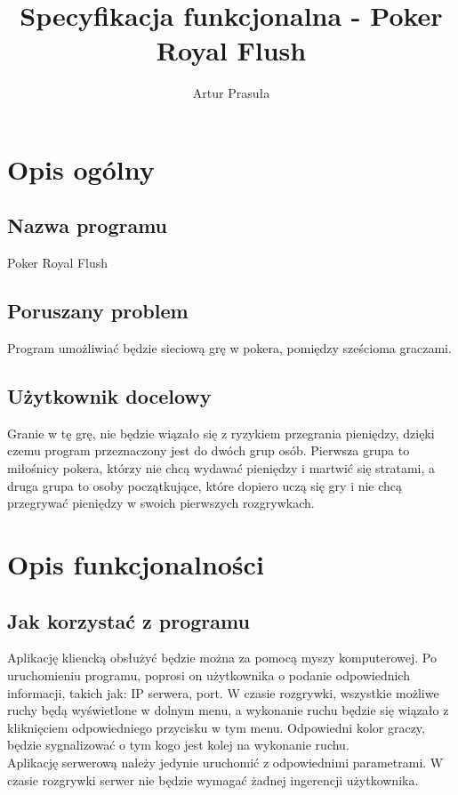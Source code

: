 \documentclass{article}
\title{Specyfikacja funkcjonalna - Poker Royal Flush}
\author{Artur Prasuła}
\begin{document}
\maketitle

\section{Opis ogólny}
    \subsection{Nazwa programu}
        Poker Royal Flush
    
    \subsection{Poruszany problem}
        Program umożliwiać będzie sieciową grę w pokera, pomiędzy sześcioma graczami.
    
    \subsection{Użytkownik docelowy}
        Granie w tę grę, nie będzie wiązało się z ryzykiem przegrania pieniędzy, dzięki czemu program przeznaczony jest do dwóch grup osób.
        Pierwsza grupa to miłośnicy pokera, którzy nie chcą wydawać pieniędzy i martwić się stratami, a
        druga grupa to osoby początkujące, które dopiero uczą się gry i nie chcą przegrywać pieniędzy w swoich pierwszych rozgrywkach.

\section{Opis funkcjonalności}
    \subsection{Jak korzystać z programu}
        Aplikację kliencką obsłużyć będzie można za pomocą myszy komputerowej.
        Po uruchomieniu programu, poprosi on użytkownika o podanie odpowiednich informacji, takich jak: IP serwera, port.
        W czasie rozgrywki, wszystkie możliwe ruchy będą wyświetlone w dolnym menu, a wykonanie ruchu będzie się wiązało z kliknięciem odpowiedniego przycisku w tym menu. Odpowiedni kolor graczy, będzie sygnalizować o tym kogo jest kolej na wykonanie ruchu.
        \\
        Aplikację serwerową należy jedynie uruchomić z odpowiednimi parametrami. W czasie rozgrywki serwer nie będzie wymagać żadnej ingerencji użytkownika.
    
\end{document}
